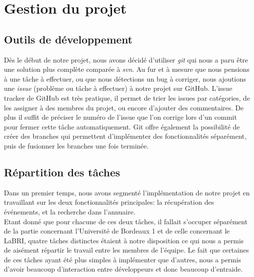 \chapter{Gestion du projet}

\section{Outils de développement}
Dès le début de notre projet, nous avons décidé d’utiliser \emph{git} qui nous a paru être une solution plus complète comparée à \emph{svn}. Au fur et à mesure que nous pensions à une tâche à effectuer, ou que nous détections un bug à corriger, nous ajoutions une \emph{issue} (problème ou tâche à effectuer) à notre projet sur GitHub. L’issue tracker de GitHub est très pratique, il permet de trier les issues par catégories, de les assigner à des membres du projet, ou encore d’ajouter des commentaires. De plus il suffit de préciser le numéro de l’issue que l’on corrige lors d’un commit pour fermer cette tâche automatiquement. Git offre également la possibilité de créer des branches qui permettent d’implémenter des fonctionnalités séparément, puis de fusionner les branches une fois terminée.

\section{Répartition des tâches}
Dans un premier temps, nous avons segmenté l’implémentation de notre projet en travaillant sur les deux fonctionnalités principales: la récupération des événements, et la recherche dans l’annuaire. \\
Etant donné que pour chacune de ces deux tâches, il fallait s’occuper séparément de la partie concernant l’Université de Bordeaux 1 et de celle concernant le LaBRI, quatre tâches distinctes étaient à notre disposition ce qui nous a permis de aisément répartir le travail entre les membres de l’équipe. Le fait que certaines de ces tâches ayant été plus simples à implémenter que d’autres, nous a permis d’avoir beaucoup d’interaction entre développeurs et donc beaucoup d’entraide.\\\\

